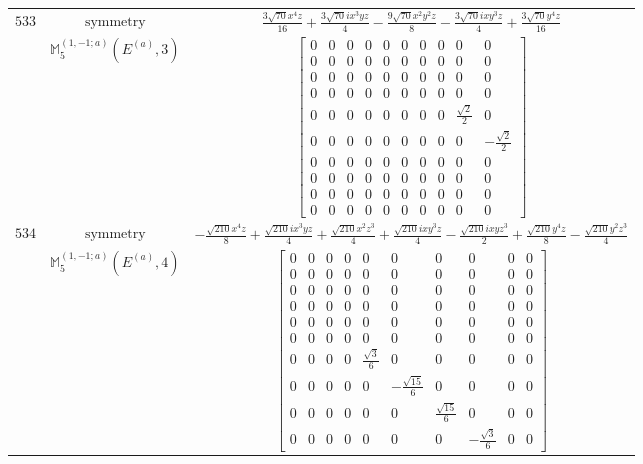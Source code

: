 \documentclass[fleqn,8pt,landscape]{jsarticle}
\begin{document}
\begin{longtable}{ccc}
$ 533 $ & $ \text{symmetry} $ & $ \frac{3 \sqrt{70} x^{4} z}{16} + \frac{3 \sqrt{70} i x^{3} y z}{4} - \frac{9 \sqrt{70} x^{2} y^{2} z}{8} - \frac{3 \sqrt{70} i x y^{3} z}{4} + \frac{3 \sqrt{70} y^{4} z}{16} $ \\
$  $ & $ \mathbb{M}_{5}^{(1,-1;a)}(E^{(a)},3) $ & $ \begin{bmatrix} 0 & 0 & 0 & 0 & 0 & 0 & 0 & 0 & 0 & 0 \\ 0 & 0 & 0 & 0 & 0 & 0 & 0 & 0 & 0 & 0 \\ 0 & 0 & 0 & 0 & 0 & 0 & 0 & 0 & 0 & 0 \\ 0 & 0 & 0 & 0 & 0 & 0 & 0 & 0 & 0 & 0 \\ 0 & 0 & 0 & 0 & 0 & 0 & 0 & 0 & \frac{\sqrt{2}}{2} & 0 \\ 0 & 0 & 0 & 0 & 0 & 0 & 0 & 0 & 0 & - \frac{\sqrt{2}}{2} \\ 0 & 0 & 0 & 0 & 0 & 0 & 0 & 0 & 0 & 0 \\ 0 & 0 & 0 & 0 & 0 & 0 & 0 & 0 & 0 & 0 \\ 0 & 0 & 0 & 0 & 0 & 0 & 0 & 0 & 0 & 0 \\ 0 & 0 & 0 & 0 & 0 & 0 & 0 & 0 & 0 & 0 \end{bmatrix} $ \\ \hline
$ 534 $ & $ \text{symmetry} $ & $ - \frac{\sqrt{210} x^{4} z}{8} + \frac{\sqrt{210} i x^{3} y z}{4} + \frac{\sqrt{210} x^{2} z^{3}}{4} + \frac{\sqrt{210} i x y^{3} z}{4} - \frac{\sqrt{210} i x y z^{3}}{2} + \frac{\sqrt{210} y^{4} z}{8} - \frac{\sqrt{210} y^{2} z^{3}}{4} $ \\
$  $ & $ \mathbb{M}_{5}^{(1,-1;a)}(E^{(a)},4) $ & $ \begin{bmatrix} 0 & 0 & 0 & 0 & 0 & 0 & 0 & 0 & 0 & 0 \\ 0 & 0 & 0 & 0 & 0 & 0 & 0 & 0 & 0 & 0 \\ 0 & 0 & 0 & 0 & 0 & 0 & 0 & 0 & 0 & 0 \\ 0 & 0 & 0 & 0 & 0 & 0 & 0 & 0 & 0 & 0 \\ 0 & 0 & 0 & 0 & 0 & 0 & 0 & 0 & 0 & 0 \\ 0 & 0 & 0 & 0 & 0 & 0 & 0 & 0 & 0 & 0 \\ 0 & 0 & 0 & 0 & \frac{\sqrt{3}}{6} & 0 & 0 & 0 & 0 & 0 \\ 0 & 0 & 0 & 0 & 0 & - \frac{\sqrt{15}}{6} & 0 & 0 & 0 & 0 \\ 0 & 0 & 0 & 0 & 0 & 0 & \frac{\sqrt{15}}{6} & 0 & 0 & 0 \\ 0 & 0 & 0 & 0 & 0 & 0 & 0 & - \frac{\sqrt{3}}{6} & 0 & 0 \end{bmatrix} $ \\ \hline

\end{longtable}
\end{document}
